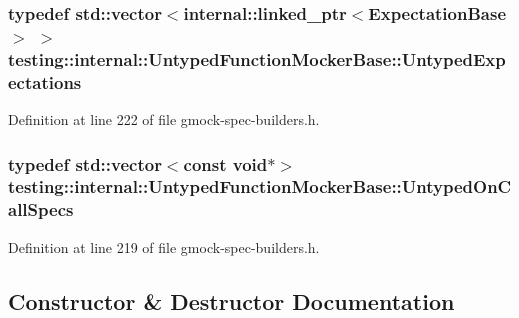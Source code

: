 \subsubsection[{\texorpdfstring{Untyped\+Expectations}{UntypedExpectations}}]{\setlength{\rightskip}{0pt plus 5cm}typedef std\+::vector$<${\bf internal\+::linked\+\_\+ptr}$<${\bf Expectation\+Base}$>$ $>$ {\bf testing\+::internal\+::\+Untyped\+Function\+Mocker\+Base\+::\+Untyped\+Expectations}\hspace{0.3cm}{\ttfamily [protected]}}\hypertarget{classtesting_1_1internal_1_1_untyped_function_mocker_base_a36480bd395e110b4eae5b0d0402de966}{}\label{classtesting_1_1internal_1_1_untyped_function_mocker_base_a36480bd395e110b4eae5b0d0402de966}


Definition at line 222 of file gmock-\/spec-\/builders.\+h.

\subsubsection[{\texorpdfstring{Untyped\+On\+Call\+Specs}{UntypedOnCallSpecs}}]{\setlength{\rightskip}{0pt plus 5cm}typedef std\+::vector$<$const void$\ast$$>$ {\bf testing\+::internal\+::\+Untyped\+Function\+Mocker\+Base\+::\+Untyped\+On\+Call\+Specs}\hspace{0.3cm}{\ttfamily [protected]}}\hypertarget{classtesting_1_1internal_1_1_untyped_function_mocker_base_a29cc87ed60ad0218432aa777abba7dbb}{}\label{classtesting_1_1internal_1_1_untyped_function_mocker_base_a29cc87ed60ad0218432aa777abba7dbb}


Definition at line 219 of file gmock-\/spec-\/builders.\+h.



\subsection{Constructor \& Destructor Documentation}
